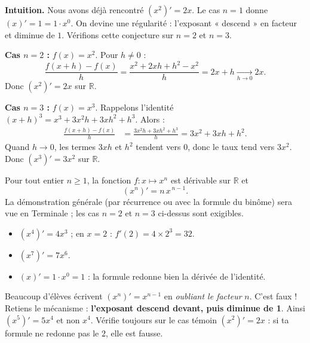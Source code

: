 \documentclass[11pt]{article}
\begin{document}
\textbf{Intuition.} Nous avons déjà rencontré $(x^2)' = 2x$. Le cas $n=1$ donne $(x)'=1=1\cdot x^0$. On devine une régularité : l'exposant « descend » en facteur et diminue de $1$. Vérifions cette conjecture sur $n=2$ et $n=3$.

\begin{experience}[Démonstrations pour $n=2$ et $n=3$]
\textbf{Cas $n=2$ :} $f(x)=x^2$. Pour $h\neq 0$ :
\[ \frac{f(x+h)-f(x)}{h} = \frac{x^2+2xh+h^2-x^2}{h} = 2x+h \xrightarrow[h\to 0]{} 2x. \]
Donc $(x^2)'=2x$ sur $\mathbb{R}$.

\textbf{Cas $n=3$ :} $f(x)=x^3$. Rappelons l'identité $(x+h)^3 = x^3+3x^2h+3xh^2+h^3$. Alors :
\begin{align*}
\frac{f(x+h)-f(x)}{h} &= \frac{3x^2h+3xh^2+h^3}{h} = 3x^2+3xh+h^2.
\end{align*}
Quand $h\to 0$, les termes $3xh$ et $h^2$ tendent vers $0$, donc le taux tend vers $3x^2$. Donc $(x^3)'=3x^2$ sur $\mathbb{R}$.
\end{experience}

\begin{propriete}
Pour tout entier $n\geq 1$, la fonction $f : x\mapsto x^n$ est dérivable sur $\mathbb{R}$ et
\[ (x^n)' = n\,x^{\,n-1}. \]
La démonstration générale (par récurrence ou avec la formule du binôme) sera vue en Terminale ; les cas $n=2$ et $n=3$ ci-dessus sont exigibles.
\end{propriete}

\begin{exemplebox}
\begin{itemize}
\item $(x^4)' = 4x^3$ ; en $x=2$ : $f'(2)=4\times 2^3 = 32$.
\item $(x^7)' = 7x^6$.
\item $(x)' = 1\cdot x^0 = 1$ : la formule redonne bien la dérivée de l'identité.
\end{itemize}
\end{exemplebox}

\begin{attention}
Beaucoup d'élèves écrivent $(x^n)' = x^{n-1}$ en \emph{oubliant le facteur} $n$. C'est faux ! Retiens le mécanisme : \textbf{l'exposant descend devant, puis diminue de 1}. Ainsi $(x^5)' = 5x^4$ et non $x^4$. Vérifie toujours sur le cas témoin $(x^2)'=2x$ : si ta formule ne redonne pas le $2$, elle est fausse.
\end{attention}
\end{document}
